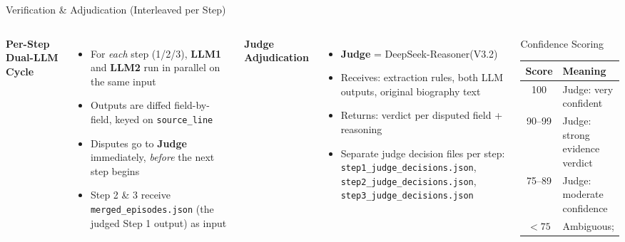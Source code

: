 \documentclass[aspectratio=169, 10pt]{beamer}
\newcommand{\llmone}{\textcolor{llm1color}{\textbf{LLM1}}}
\newcommand{\llmtwo}{\textcolor{llm2color}{\textbf{LLM2}}}
\newcommand{\judge}{\textcolor{judgecolor}{\textbf{Judge}}}
\begin{document}
\begin{frame}{Verification \& Adjudication (Interleaved per Step)}
  \begin{columns}[T]
    \textbf{Per-Step Dual-LLM Cycle}
    \begin{itemize}
      \item For \emph{each} step (1/2/3), \llmone{} and \llmtwo{} run in parallel on the same input
      \item Outputs are diffed field-by-field, keyed on \texttt{source\_line}
      \item Disputes go to \judge{} immediately, \emph{before} the next step begins
      \item Step 2 \& 3 receive \texttt{merged\_episodes.json} (the judged Step 1 output) as input
    \end{itemize}

    \textbf{Judge Adjudication}
    \begin{itemize}
      \item \judge{} = DeepSeek-Reasoner(V3.2)
      \item Receives: extraction rules, both LLM outputs, original biography text
      \item Returns: verdict per disputed field + reasoning
      \item Separate judge decision files per step:\\
            {\scriptsize \texttt{step1\_judge\_decisions.json},
             \texttt{step2\_judge\_decisions.json},
             \texttt{step3\_judge\_decisions.json}}
    \end{itemize}

    \begin{block}{Confidence Scoring}
      \begin{tabular}{cl}
        \toprule
        Score & Meaning \\
        \midrule
        100 &  Judge: very confident \\
        90--99 & Judge: strong evidence verdict \\
        75--89 & Judge: moderate confidence \\
        $<75$  & Ambiguous; \\
        \bottomrule
      \end{tabular}
    \end{block}


\end{columns}
\end{frame}
\end{document}
